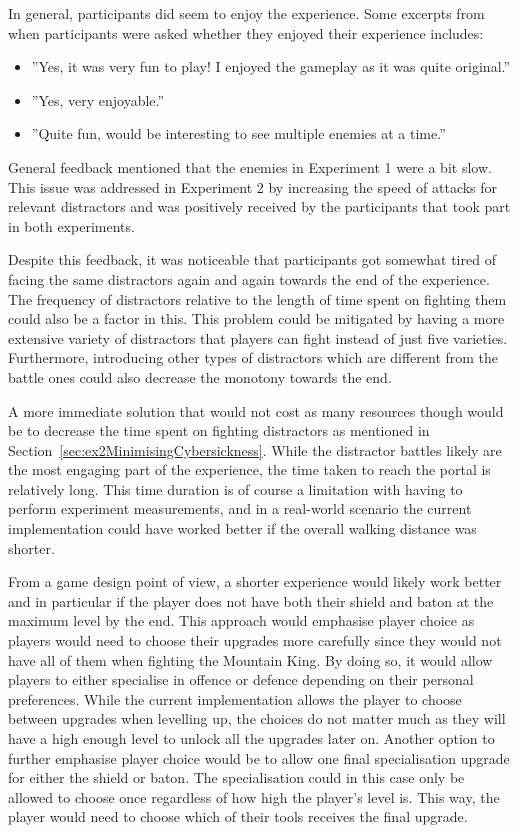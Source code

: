In general, participants did seem to enjoy the experience. Some excerpts from when participants were asked whether they enjoyed their experience includes:

\begin{itemize}
    \item ''Yes, it was very fun to play! I enjoyed the gameplay as it was quite original.''
    \item ''Yes, very enjoyable.''
    \item ''Quite fun, would be interesting to see multiple enemies at a time.''
\end{itemize}

General feedback mentioned that the enemies in Experiment 1 were a bit slow. This issue was addressed in Experiment 2 by increasing the speed of attacks for relevant distractors and was positively received by the participants that took part in both experiments. 

Despite this feedback, it was noticeable that participants got somewhat tired of facing the same distractors again and again towards the end of the experience. The frequency of distractors relative to the length of time spent on fighting them could also be a factor in this. This problem could be mitigated by having a more extensive variety of distractors that players can fight instead of just five varieties. Furthermore, introducing other types of distractors which are different from the battle ones could also decrease the monotony towards the end. 

A more immediate solution that would not cost as many resources though would be to decrease the time spent on fighting distractors as mentioned in Section~\ref{sec:ex2MinimisingCybersickness}. While the distractor battles likely are the most engaging part of the experience, the time taken to reach the portal is relatively long. This time duration is of course a limitation with having to perform experiment measurements, and in a real-world scenario the current implementation could have worked better if the overall walking distance was shorter. 

From a game design point of view, a shorter experience would likely work better and in particular if the player does not have both their shield and baton at the maximum level by the end. This approach would emphasise player choice as players would need to choose their upgrades more carefully since they would not have all of them when fighting the Mountain King. By doing so, it would allow players to either specialise in offence or defence depending on their personal preferences. While the current implementation allows the player to choose between upgrades when levelling up, the choices do not matter much as they will have a high enough level to unlock all the upgrades later on. Another option to further emphasise player choice would be to allow one final specialisation upgrade for either the shield or baton. The specialisation could in this case only be allowed to choose once regardless of how high the player's level is. This way, the player would need to choose which of their tools receives the final upgrade.  

